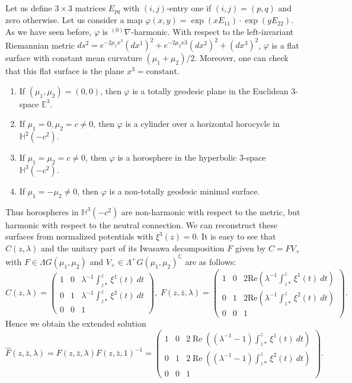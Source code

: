 \documentclass[12pt]{amsart}
\theoremstyle{definition}
\theoremstyle{remark}
\numberwithin{equation}{section}
\begin{document}
 Let us define $3 \times 3$ matrices $E_{p q}$ 
 with $(i, j)$-entry one if $(i, j) =(p, q)$ and zero otherwise.
 Let us consider a map $\varphi(x,y)=\exp(xE_{11})\cdot \exp(yE_{22})$.
 As we have seen before, $\varphi$ is ${{}^{(0)}\nabla}$-harmonic. 
 With respect to the left-invariant Riemannian metric
 $ds^2 = e^{-2\mu_1 x^3 }(dx^1)^2 + e^{-2\mu_2 x3} (dx^2)^2 + (dx^3)^2$, 
 $\varphi$ is a flat surface with constant mean 
 curvature $(\mu_1+\mu_2)/2$. 
 Moreover, one can check that this flat surface is 
 the plane $x^3=\mathrm{constant}$.
\begin{enumerate}
\item If $(\mu_1,\mu_2)=(0,0)$, then
$\varphi$ is a totally geodesic plane in the Euclidean $3$-space $\mathbb{E}^3$.  
\item If $\mu_1 =0, \mu_2 =c \neq 0$, then $\varphi$ is a cylinder over a horizontal
 horocycle in $\mathbb H^2 (-c^2)$.
\item If $\mu_1=\mu_2=c\not=0$, then $\varphi$ is a horosphere in 
the hyperbolic $3$-space $\mathbb{H}^3(-c^2)$.
\item If $\mu_1=-\mu_2\not=0$, then $\varphi$ is 
a non-totally geodesic minimal surface.
\end{enumerate}
 Thus horospheres in $\mathbb{H}^3(-c^2)$ are 
 non-harmonic with respect to the metric, but harmonic with 
 respect to the neutral connection.
 We can reconstruct these surfaces from normalized potentials with $\xi^3(z)=0$.
 It is easy to see that $C(z, {\lambda})$ and the unitary part of 
 its Iwasawa decomposition $F$ given by $C = FV_+$ with $F \in \Lambda G(\mu_1,\mu_2)$ 
 and  $V_+ \in \Lambda^+ G(\mu_1,\mu_2)^{\mathbb C}$ are as follows:
\begin{equation*}
 C(z, {\lambda}) = 
\begin{pmatrix} 
  1 & 0 & {\lambda}^{-1} \int_{z*}^z  \xi^1(t) \>dt \\
  0 & 1 &  {\lambda}^{-1} \int_{z*}^z \xi^2(t)  \>dt \\
  0 & 0 & 1
\end{pmatrix}, \;
 F(z,\bar{z}, {\lambda}) =
 \begin{pmatrix}
  1 & 0 & 2 \mathrm{Re}({\lambda}^{-1} \int_{z*}^z  \xi^1(t) \>dt)\\[0.1cm]
  0 & 1 & 2 \mathrm{Re}({\lambda}^{-1} \int_{z*}^z  \xi^2(t) \>dt) \\
  0 & 0 & 1
 \end{pmatrix}.
\end{equation*}
 Hence we obtain the extended solution
\begin{equation*}
\hat{F}(z,\bar{z},\lambda)=
F(z,\bar{z},\lambda)
F(z,\bar{z},1)^{-1}=
\begin{pmatrix}
  1 & 0 & 2 {\operatorname {Re}}\left(({\lambda}^{-1} -1)\int_{z*}^z  \xi^1(t) \>dt\right)\\[0.1cm]
  0 & 1 & 2 {\operatorname {Re}}\left(({\lambda}^{-1} -1)\int_{z*}^z  \xi^2(t) \>dt\right)\\
  0 & 0 & 1
 \end{pmatrix}.
\end{equation*}
\end{document}
